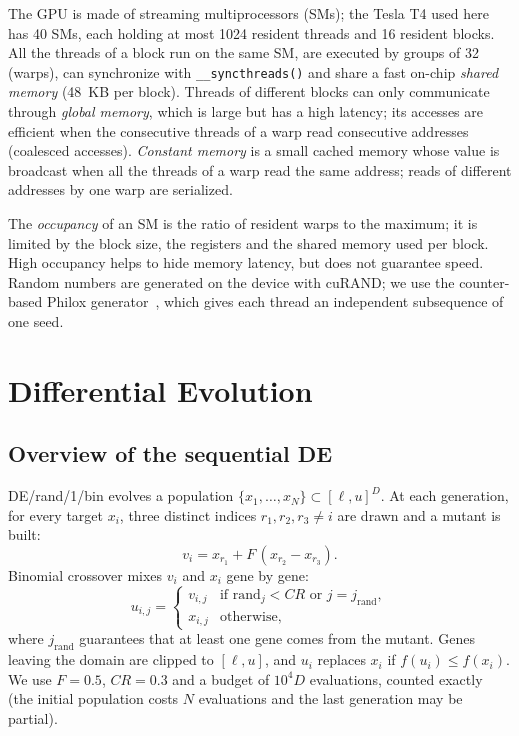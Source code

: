 \documentclass[conference]{IEEEtran}
\begin{document}
The GPU is made of streaming multiprocessors (SMs); the Tesla T4 used here has 40 SMs,
each holding at most 1024 resident threads and 16 resident blocks. All the threads of a
block run on the same SM, are executed by groups of 32 (warps), can synchronize with
\texttt{\_\_syncthreads()} and share a fast on-chip \emph{shared memory} (48~KB per block).
Threads of different blocks can only communicate through \emph{global memory}, which is large
but has a high latency; its accesses are efficient when the consecutive threads of a warp
read consecutive addresses (coalesced accesses). \emph{Constant memory} is a small cached
memory whose value is broadcast when all the threads of a warp read the same address; reads
of different addresses by one warp are serialized.

The \emph{occupancy} of an SM is the ratio of resident warps to the maximum; it is limited by
the block size, the registers and the shared memory used per block. High occupancy helps to
hide memory latency, but does not guarantee speed. Random numbers are generated on the
device with cuRAND; we use the counter-based Philox generator~\cite{salmon2011}, which gives
each thread an independent subsequence of one seed.

\section{Differential Evolution}\label{sec:de}
\subsection{Overview of the sequential DE}
DE/rand/1/bin evolves a population $\{x_1,\dots,x_N\}\subset[\ell,u]^D$. At each generation,
for every target $x_i$, three distinct indices $r_1,r_2,r_3\neq i$ are drawn and a mutant is
built:
\begin{equation}
v_i = x_{r_1} + F\,(x_{r_2}-x_{r_3}).
\label{eq:mut}
\end{equation}
Binomial crossover mixes $v_i$ and $x_i$ gene by gene:
\begin{equation}
u_{i,j} = \begin{cases} v_{i,j} & \text{if } \mathrm{rand}_j < CR \text{ or } j=j_{\mathrm{rand}},\\
x_{i,j} & \text{otherwise,}\end{cases}
\label{eq:cross}
\end{equation}
where $j_{\mathrm{rand}}$ guarantees that at least one gene comes from the mutant. Genes
leaving the domain are clipped to $[\ell,u]$, and $u_i$ replaces $x_i$ if
$f(u_i)\le f(x_i)$. We use $F=0.5$, $CR=0.3$ and a budget of $10^4D$ evaluations, counted
exactly (the initial population costs $N$ evaluations and the last generation may be
partial).
\end{document}
